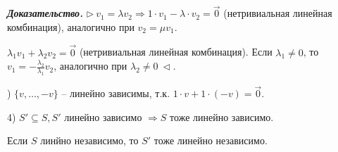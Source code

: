 \textbf{\textit{Доказательство.}} $\rhd \ v_1 = \lambda v_2 \Rightarrow 1 \cdot v_1 - \lambda \cdot v_2 = \overrightarrow{0}$ (нетривиальная линейная комбинация), аналогично при $v_2 = \mu v_1$.

$\lambda_1 v_1 + \lambda_2 v_2 = \overrightarrow{0}$ (нетривиальная линейная комбинация). Если $\lambda_1 \neq 0$, то $v_1 = -\frac{\lambda_2}{\lambda_1} v_2$, аналогично при $\lambda_2 \neq 0 \ \lhd$.

) $\{v, \dots, -v\}$ -- линейно зависимы, т.к. $1 \cdot v + 1 \cdot (-v) = \overrightarrow{0}$.

4) $S' \subseteq S, S'$ линейно зависимо $\Rightarrow S$ тоже линейно зависимо.

Если $S$ линйно независимо, то $S'$ тоже линейно независимо.

